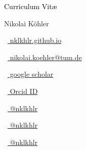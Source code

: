 \begin{scriptsize}
	 \textcolor{black}{Curriculum Vit\ae}
\end{scriptsize}

\vspace*{0.2cm}
\begin{Large}
	Nikolai K\"ohler
\end{Large}

\vspace*{0.20em}
%
\vspace*{0.2cm}

\begin{footnotesize}
	\begin{tiny}\faHome\end{tiny}~\href{https://nklkhlr.github.io}{
		nklkhlr.github.io
	}

	\quad
	\begin{tiny}\faEnvelope[regular]\end{tiny}~\href{mailto:nikolai.koehler@tum.de}{%
		nikolai.koehler@tum.de
	}
	\quad\vspace{.1cm}
	\begin{tiny}\faGraduationCap\end{tiny}~\href{https://scholar.google.com/citations?user=R-szd0IAAAAJ&hl=en&oi=ao}{
		 google scholar
		}
	\begin{tiny}\faOrcid\end{tiny}~\href{https://orcid.org/0000-0002-5103-883X?lang=en}{
		 Orcid ID
		}
	\quad\vspace{.15cm}

	\begin{tiny}\faTwitter\end{tiny}~\href{https://twitter.com/nklkhlr}{
		@nklkhlr
	}
	\quad
	\begin{tiny}\faGithub\end{tiny}~\href{https://github.com/nklkhlr}{
		@nklkhlr
	}
	\begin{tiny}\faGitlab\end{tiny}~\href{https://gitlab.lrz.de/nklkhlr}{
		@nklkhlr
	}

\end{footnotesize}
